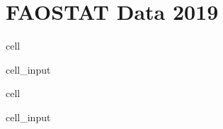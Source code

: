 \documentclass[letterpaper,10pt,english]{jupyterBook}
\begin{document}
\section{FAOSTAT Data 2019}
\label{\detokenize{notebooks/replicating_paper:faostat-data-2019}}
\begin{sphinxuseclass}{cell}\begin{sphinxVerbatimInput}

\begin{sphinxuseclass}{cell_input}
\begin{sphinxVerbatim}[commandchars=\\\{\}]
  

  
\end{sphinxVerbatim}

\end{sphinxuseclass}\end{sphinxVerbatimInput}

\end{sphinxuseclass}
\begin{sphinxuseclass}{cell}\begin{sphinxVerbatimInput}

\begin{sphinxuseclass}{cell_input}
\begin{sphinxVerbatim}[commandchars=\\\{\}]
  \PYG{p}{[}\PYG{p}{[}   \PYG{p}{]}\PYG{p}{]}
\end{sphinxVerbatim}

\end{sphinxuseclass}\end{sphinxVerbatimInput}

\end{sphinxuseclass}
\end{document}
